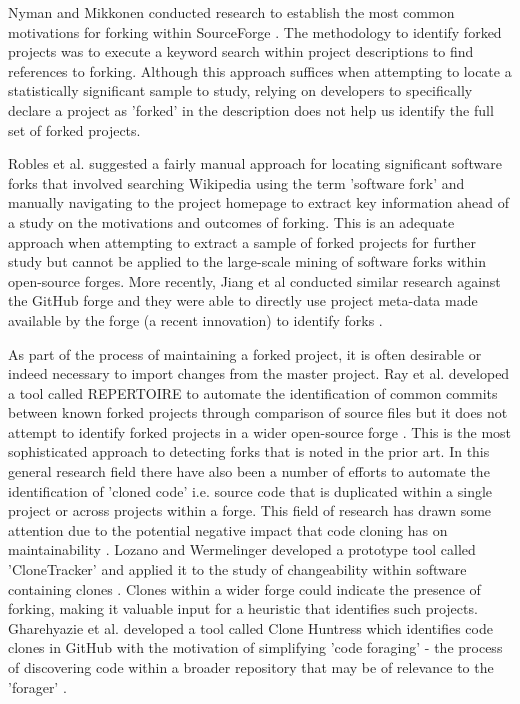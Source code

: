 Nyman and Mikkonen conducted research to establish the most common motivations for forking within SourceForge \citep{nyman2011fork}. The methodology to identify forked projects was to execute a keyword search within project descriptions to find references to forking. Although this approach suffices when attempting to locate a statistically significant  sample to study, relying on developers to specifically declare a project as 'forked' in the description does not help us identify the full set of forked projects.

Robles et al. \citep{robles2006mining} suggested a fairly manual approach for locating significant software forks that involved searching Wikipedia using the term 'software fork' and manually navigating to the project homepage to extract key information ahead of a study on the motivations and outcomes of forking. This is an adequate approach when attempting to extract a sample of forked projects for further study but cannot be applied to the large-scale mining of software forks within open-source forges. More recently, Jiang et al conducted similar research against the GitHub forge and they were able to directly use project meta-data made available by the forge (a recent innovation) to identify forks \citep{jiang2017and}.

As part of the process of maintaining a forked project, it is often desirable or indeed necessary to import changes from the master project. Ray et al. developed a tool called REPERTOIRE to automate the identification of common commits between known forked projects through comparison of source files but it does not attempt to identify forked projects in a wider open-source forge \citep{ray2012repertoire}. This is the most sophisticated approach to detecting forks that is noted in the prior art. In this general research field there have also been a number of efforts to automate the identification of 'cloned code' i.e. source code that is duplicated within a single project or across projects within a forge. This field of research has drawn some attention due to the potential negative impact that code cloning has on maintainability \citep{lozano2007evaluating}. Lozano and Wermelinger developed a prototype tool called 'CloneTracker' and applied it to the study of changeability within software containing clones \citep{lozano2008assessing}. Clones within a wider forge could indicate the presence of forking, making it valuable input for a heuristic that identifies such projects. Gharehyazie et al. developed a tool called Clone Huntress which identifies code clones in GitHub with the motivation of simplifying 'code foraging' - the process of discovering code within a broader repository that may be of relevance to the 'forager' \citep{gharehyazie2018cross}.

